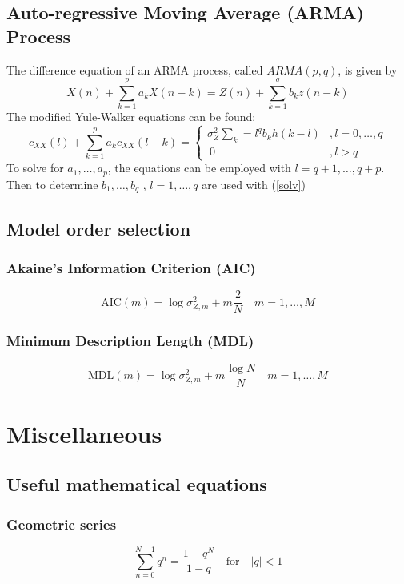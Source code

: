 \documentclass[accentcolor=tud4c,9.5pt,nochapname,bigchapter,paper=a5report]{tudreport}
\begin{document}
\section{Auto-regressive Moving Average (ARMA) Process}
The difference equation of an ARMA process, called $ARMA(p,q)$, is given by
\begin{equation}
X(n)+\sum\limits_{k=1}^p a_kX(n-k) = Z(n)+\sum\limits_{k=1}^q b_kz(n-k)
\end{equation}
The modified Yule-Walker equations can be found:
\begin{equation}
c_{XX}(l)+\sum\limits_{k=1}^p a_k c_{XX}(l-k) = \begin{cases}
\sigma_Z^2\sum_k=l^q b_kh(k-l) &,l=0,\ldots,q\\\
0&,l>q
\end{cases}
\end{equation}
To solve for $a_1,\ldots,a_p$, the equations can be employed with $l=q+1,\ldots,q+p$. Then to determine $b_1,\ldots,b_q$ , $l=1,\ldots,q$ are used with (\ref{solv})

\section{Model order selection}
\subsection{Akaine's Information Criterion (AIC)}
\begin{equation}
\text{AIC}(m)=\log \sigma_{Z,m}^2 + m\frac{2}{N} \quad m=1,\ldots,M
\end{equation}
\subsection{Minimum Description Length (MDL)}
\begin{equation}
\text{MDL}(m)=\log \sigma_{Z,m}^2 + m\frac{\log N}{N} \quad m=1,\ldots,M
\end{equation}
\chapter{Miscellaneous}
\section{Useful mathematical equations}
\subsection{Geometric series}
\begin{equation}
\sum\limits_{n=0}^{N-1} q^n = \frac{1-q^N}{1-q} \quad \text{for} \quad|q|<1
\end{equation} 
\end{document}
